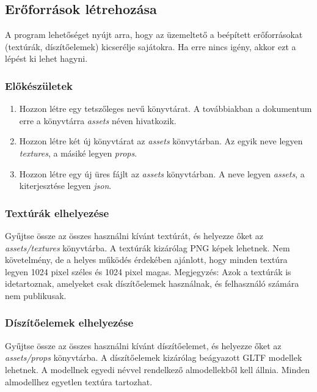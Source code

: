 \subsection{Erőforrások létrehozása}

A program lehetőséget nyújt arra, hogy az üzemeltető a beépített erőforrásokat
(textúrák, díszítőelemek) kicserélje sajátokra. Ha erre nincs igény, akkor ezt a lépést ki lehet
hagyni.

\subsubsection{Előkészületek}

\begin{enumerate}
    \item Hozzon létre egy tetszőleges nevű könyvtárat. A továbbiakban a dokumentum erre a
    könyvtárra \emph{assets} néven hivatkozik.

    \item Hozzon létre két új könyvtárat az \emph{assets} könvytárban. Az egyik neve legyen
    \emph{textures}, a másiké legyen \emph{props}.

    \item Hozzon létre egy új üres fájlt az \emph{assets} könyvtárban. A neve legyen \emph{assets},
    a kiterjesztése legyen \emph{json}.
\end{enumerate}

\subsubsection{Textúrák elhelyezése}

Gyűjtse össze az összes használni kívánt textúrát, és helyezze őket az \emph{assets/textures}
könyvtárba. A textúrák kizárólag PNG képek lehetnek. Nem követelmény, de a helyes működés érdekében
ajánlott, hogy minden textúra legyen 1024 pixel széles és 1024 pixel magas. Megjegyzés: Azok a
textúrák is idetartoznak, amelyeket csak díszítőelemek használnak, és felhasználó számára nem
publikusak.

\subsubsection{Díszítőelemek elhelyezése}

Gyűjtse össze az összes használni kívánt díszítőelemet, és helyezze őket az \emph{assets/props}
könyvtárba. A díszítőelemek kizárólag beágyazott GLTF modellek lehetnek. A modellnek egyedi
névvel rendelkező almodellekből kell állnia. Minden almodellhez egyetlen textúra tartozhat.

